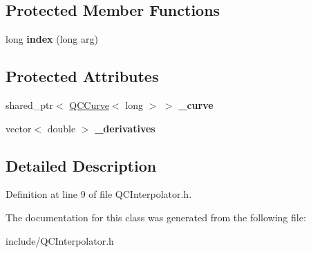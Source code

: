 \subsection*{Protected Member Functions}
\begin{DoxyCompactItemize}
\item 
\hypertarget{class_q_c_interpolator_a72bf1a0bb40df70d4b90e2a6d8c032f8}{long {\bfseries index} (long arg)}\label{class_q_c_interpolator_a72bf1a0bb40df70d4b90e2a6d8c032f8}

\end{DoxyCompactItemize}
\subsection*{Protected Attributes}
\begin{DoxyCompactItemize}
\item 
\hypertarget{class_q_c_interpolator_ade6d623eb8e1a40b0337d41f511781dd}{shared\+\_\+ptr$<$ \hyperlink{class_q_c_curve}{Q\+C\+Curve}$<$ long $>$ $>$ {\bfseries \+\_\+curve}}\label{class_q_c_interpolator_ade6d623eb8e1a40b0337d41f511781dd}

\item 
\hypertarget{class_q_c_interpolator_ac16264cdb256f83cc64d40719c2658c1}{vector$<$ double $>$ {\bfseries \+\_\+derivatives}}\label{class_q_c_interpolator_ac16264cdb256f83cc64d40719c2658c1}

\end{DoxyCompactItemize}


\subsection{Detailed Description}


Definition at line 9 of file Q\+C\+Interpolator.\+h.



The documentation for this class was generated from the following file\+:\begin{DoxyCompactItemize}
\item 
include/Q\+C\+Interpolator.\+h\end{DoxyCompactItemize}
